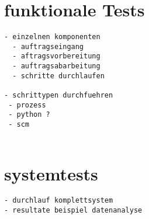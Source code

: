 \section{funktionale Tests}

\begin{verbatim}
- einzelnen komponenten
  - auftragseingang
  - aftragsvorbereitung
  - auftragsabarbeitung
  - schritte durchlaufen

- schrittypen durchfuehren
 - prozess
 - python ?
 - scm


\end{verbatim}

\section{systemtests}

\begin{verbatim}
- durchlauf komplettsystem
- resultate beispiel datenanalyse

\end{verbatim}

